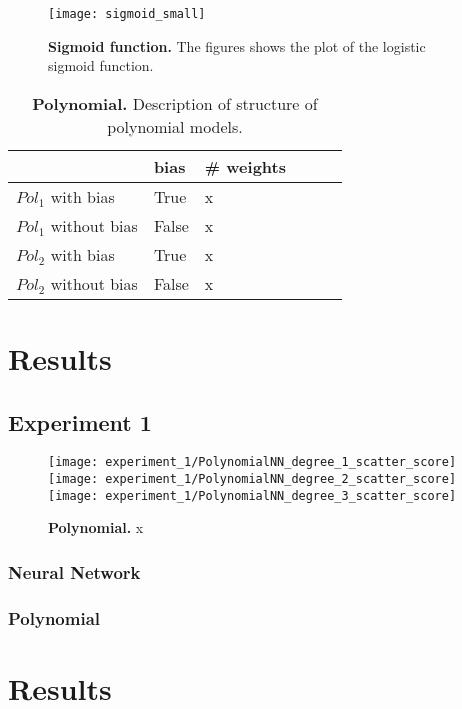 \begin{figure}[ht]
\centering
\texttt{[image: sigmoid\_small]}
\caption[Simoid function]{
  \textbf{Sigmoid function.}
  The figures shows the plot of the logistic sigmoid function.
}
\label{fig:sigmoid}
\end{figure}

\begin{table}[h!] %
\label{tab:example}
\center
\begin{tabular}{m{40mm}lllll}
  \toprule
  & bias & \# weights \\
  \midrule
  $Pol_1$ with bias & True & x \\
  $Pol_1$ without bias & False & x \\
  $Pol_2$ with bias & True & x \\
  $Pol_2$ without bias & False & x \\
  \bottomrule
  \end{tabular}
  \caption[Example]{%
    \textbf{Polynomial.}
    Description of structure of polynomial models.
  }
\end{table}


\section{Results}
\subsection{Experiment 1}
\begin{figure}[ht]
\centering
\texttt{[image: experiment\_1/PolynomialNN\_degree\_1\_scatter\_score]}
\texttt{[image: experiment\_1/PolynomialNN\_degree\_2\_scatter\_score]}
\texttt{[image: experiment\_1/PolynomialNN\_degree\_3\_scatter\_score]}
\caption[Experiment 1: Polynomial]{
  \textbf{Polynomial.}
  x
}
\label{fig:polynomialNN_results}
\end{figure}


\subsubsection{Neural Network}

\subsubsection{Polynomial}

\section{Results}
